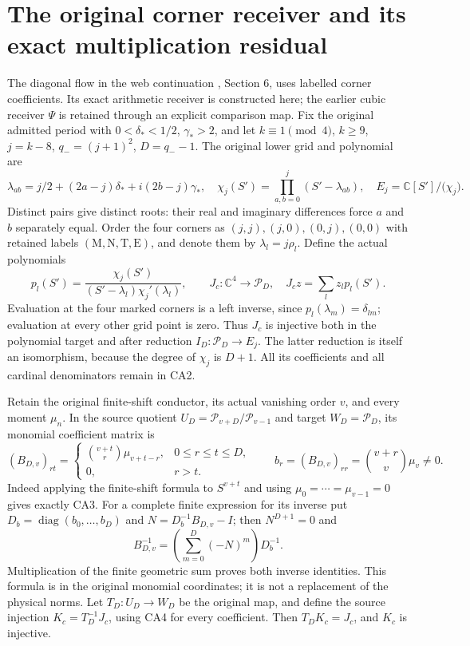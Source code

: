\documentclass[11pt]{article}
\newcommand{\C}{\mathbb C}
\begin{document}
\section{The original corner receiver and its exact multiplication residual}
The diagonal flow in the web continuation \cite{WebFable}, Section 6,
uses labelled corner coefficients. Its exact arithmetic receiver is
constructed here; the earlier cubic receiver $\Psi$ is retained through
an explicit comparison map. Fix the original admitted period with
$0<\delta_*<1/2$, $\gamma_*>2$, and let $k\equiv1\pmod4$,
$k\ge9$, $j=k-8$, $q_-=(j+1)^2$, $D=q_--1$. The original lower
grid and polynomial are
\[
 \lambda_{ab}=j/2+(2a-j)\delta_*+i(2b-j)\gamma_*,\quad
 \chi_j(S')=\prod_{a,b=0}^j(S'-\lambda_{ab}),\quad
 E_j=\C[S']/\bigl(\chi_j\bigr). \tag{CA1}
\]
Distinct pairs give distinct roots: their real and imaginary
differences force $a$ and $b$ separately equal. Order the four corners
as $(j,j),(j,0),(0,j),(0,0)$ with retained labels
$(\mathrm M,\mathrm N,\mathrm T,\mathrm E)$, and denote them by
$\lambda_l=j\rho_l$. Define the actual polynomials
\[
 p_l(S')=\frac{\chi_j(S')}
 {(S'-\lambda_l)\chi_j'(\lambda_l)},\qquad
 J_c:\C^4\longrightarrow\mathcal P_D,\quad
 J_c z=\sum_l z_l p_l(S'). \tag{CA2}
\]
Evaluation at the four marked corners is a left inverse, since
$p_l(\lambda_m)=\delta_{lm}$; evaluation at every other grid
point is zero. Thus $J_c$ is injective both in the polynomial
target and after reduction $I_D:\mathcal P_D\to E_j$.
The latter reduction is itself an isomorphism, because the
degree of $\chi_j$ is $D+1$. All its coefficients and all
cardinal denominators remain in CA2.

Retain the original finite-shift conductor, its actual vanishing
order $v$, and every moment $\mu_n$. In the source quotient
$U_D=\mathcal P_{v+D}/\mathcal P_{v-1}$ and target
$W_D=\mathcal P_D$, its monomial coefficient matrix is
\[
 (B_{D,v})_{rt}=\begin{cases}
 \binom{v+t}{r}\mu_{v+t-r},&0\le r\le t\le D,\\
 0,&r>t.
 \end{cases}\qquad
 b_r=(B_{D,v})_{rr}=\binom{v+r}{v}\mu_v\ne0. \tag{CA3}
\]
Indeed applying the finite-shift formula to $S^{v+t}$ and
using $\mu_0=\cdots=\mu_{v-1}=0$ gives exactly CA3.
For a complete finite expression for its inverse put
$D_b=\operatorname{diag}(b_0,\ldots,b_D)$ and
$N=D_b^{-1}B_{D,v}-I$; then $N^{D+1}=0$ and
\[
 B_{D,v}^{-1}=\left(\sum_{m=0}^D(-N)^m\right)D_b^{-1}.
 \tag{CA4}
\]
Multiplication of the finite geometric sum proves both inverse
identities. This formula is in the original monomial coordinates;
it is not a replacement of the physical norms. Let $T_D:U_D\to W_D$
be the original map, and define the source injection
$K_c=T_D^{-1}J_c$, using CA4 for every coefficient. Then
$T_DK_c=J_c$, and $K_c$ is injective.
\end{document}
